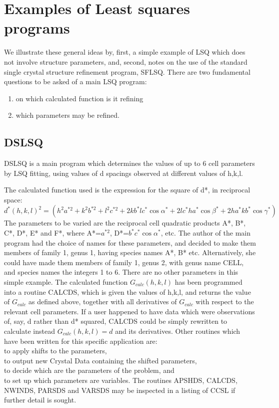 \section{Examples of Least squares programs}
%
We illustrate these general ideas by, first, a simple example of LSQ
which does not involve structure parameters, and, second, notes on the
use of the standard single crystal structure refinement program, SFLSQ.
\p
There are two fundamental questions to be asked of a main LSQ program:
\begin{enumerate}
\item on which calculated function is it refining 
\item which parameters may be refined.
\end{enumerate}
%
\subsection{DSLSQ}
% 
DSLSQ is a main program which determines the values of up to 6 cell
parameters by LSQ fitting, using values of d spacings observed at 
different values of h,k,l.

The calculated function used is the expression for the square of d*, 
in reciprocal space:
$$d^*(h,k,l)^2 = (h^2a^{*2} + k^2b^{*2} + l^2c^{*2} +
         2kb^*l c^*\cos\alpha^* + 2lc^*ha^*\cos\beta^*
 + 2ha^*kb^*\cos\gamma^*)
$$
The parameters to be varied are the reciprocal cell quadratic products
A*, B*, C*, D*, E* and F*, where A*=$a^{*2}$, D*=$b^*c^*\cos\alpha^*$, etc.
\p
The author of the main program had the choice of names for these
parameters, and decided to make them members of family 1, genus 1,
having species names A*, B* etc.  Alternatively, she could have made 
them members of
family 1, genus 2, with genus name CELL, and species names the integers
1 to 6.  There are no other parameters in this simple example.
\p 
The calculated function $G_{calc}(h,k,l)$ has been programmed into a routine
CALCDS, which is given the values of h,k,l, and returns the value of 
$G_{calc}$ as
defined above, together with all derivatives of $G_{calc}$ with respect to
the relevant cell parameters. If a user happened to have data which were
observations of, say, d rather than d* squared, CALCDS could be simply
rewritten to calculate instead $G_{calc}(h,k,l)=d$ and its derivatives.
\p 
Other routines which have been written for this specific application are:\\
 to apply shifts to the parameters,\\
 to output new Crystal Data containing the shifted parameters,\\
 to decide which are the parameters of the problem, and\\
 to set up which parameters are variables.
\p 
The routines APSHDS, CALCDS, NWINDS, PARSDS and VARSDS may be inspected
in a listing of CCSL if further detail is sought.
% 
